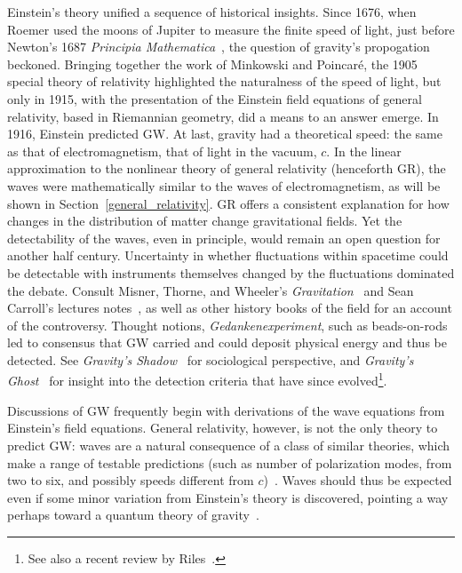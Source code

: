         Einstein's theory unified a sequence of historical insights. 
Since 1676, when Roemer used the moons of Jupiter to measure the finite speed of light, just before Newton's 1687 \textit{Principia Mathematica}~\cite{Hawking2002}, the question of gravity's propogation beckoned. 
Bringing together the work of Minkowski and Poincar\'{e}, the 1905 special theory of relativity highlighted the naturalness of the speed of light, but only in 1915, with the presentation of the Einstein field equations of general relativity, based in Riemannian geometry, did a means to an answer emerge. 
In 1916, Einstein predicted GW. 
At last, gravity had a theoretical speed: the same as that of electromagnetism, that of light in the vacuum, $c$.
In the linear approximation to the nonlinear theory of general relativity (henceforth GR), the waves were mathematically similar to the waves of electromagnetism, as will be shown in Section~\ref{general_relativity}.
GR offers a consistent explanation for how changes in the distribution of matter change gravitational fields.
Yet the detectability of the waves, even in principle, would remain an open question for another half century. 
Uncertainty in whether fluctuations within spacetime could be detectable with instruments themselves changed by the fluctuations dominated the debate.
Consult Misner, Thorne, and Wheeler's \textit{Gravitation}~\cite{MisnerThorneWheeler} and Sean Carroll's lectures notes~\cite{Carroll1997}, as well as other history books of the field for an account of the controversy.
Thought notions, \textit{Gedankenexperiment}, such as beads-on-rods led to consensus that GW carried and could deposit physical energy and thus be detected. 
See \textit{Gravity's Shadow}~\cite{CollinsGravityShadow} for sociological perspective, and 
\textit{Gravity's Ghost}~\cite{CollinsGravityGhost} for insight into the detection criteria that have since evolved\footnote{See also a recent review by Riles~\cite{Riles2013}.}.

Discussions of GW frequently begin with derivations of the wave equations from Einstein's field equations. 
General relativity, however, is not the only theory to predict GW: waves are a natural consequence of a class of similar theories, which make a range of testable predictions (such as number of polarization modes, from two to six, and possibly speeds different from $c$)~\cite{Will1993}. 
Waves should thus be expected even if some minor variation from Einstein's theory is discovered, pointing a way perhaps toward a quantum theory of gravity~\cite{Sathyaprakash2009}. 

